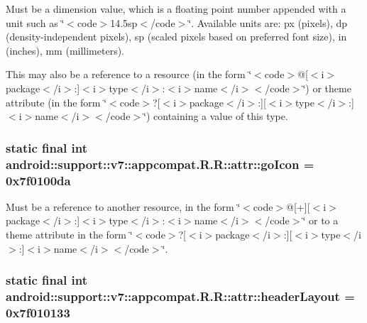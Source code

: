 Must be a dimension value, which is a floating point number appended with a unit such as \char`\"{}$<$code$>$14.5sp$<$/code$>$\char`\"{}. Available units are: px (pixels), dp (density-independent pixels), sp (scaled pixels based on preferred font size), in (inches), mm (millimeters). 

This may also be a reference to a resource (in the form \char`\"{}$<$code$>$@\mbox{[}$<$i$>$package$<$/i$>$:\mbox{]}$<$i$>$type$<$/i$>$:$<$i$>$name$<$/i$>$$<$/code$>$\char`\"{}) or theme attribute (in the form \char`\"{}$<$code$>$?\mbox{[}$<$i$>$package$<$/i$>$:\mbox{]}\mbox{[}$<$i$>$type$<$/i$>$:\mbox{]}$<$i$>$name$<$/i$>$$<$/code$>$\char`\"{}) containing a value of this type. \hypertarget{classandroid_1_1support_1_1v7_1_1appcompat_1_1_r_1_1attr_900dccd18fa2271d4f852022b6c91a1e}{
\subsubsection[{goIcon}]{\setlength{\rightskip}{0pt plus 5cm}static final int android::support::v7::appcompat.R.R::attr::goIcon = 0x7f0100da}}
\label{classandroid_1_1support_1_1v7_1_1appcompat_1_1_r_1_1attr_900dccd18fa2271d4f852022b6c91a1e}


Must be a reference to another resource, in the form \char`\"{}$<$code$>$@\mbox{[}+\mbox{]}\mbox{[}$<$i$>$package$<$/i$>$:\mbox{]}$<$i$>$type$<$/i$>$:$<$i$>$name$<$/i$>$$<$/code$>$\char`\"{} or to a theme attribute in the form \char`\"{}$<$code$>$?\mbox{[}$<$i$>$package$<$/i$>$:\mbox{]}\mbox{[}$<$i$>$type$<$/i$>$:\mbox{]}$<$i$>$name$<$/i$>$$<$/code$>$\char`\"{}. \hypertarget{classandroid_1_1support_1_1v7_1_1appcompat_1_1_r_1_1attr_3f47554d227f38f8ddc7dfbbf363102a}{
\subsubsection[{headerLayout}]{\setlength{\rightskip}{0pt plus 5cm}static final int android::support::v7::appcompat.R.R::attr::headerLayout = 0x7f010133}}
\label{classandroid_1_1support_1_1v7_1_1appcompat_1_1_r_1_1attr_3f47554d227f38f8ddc7dfbbf363102a}


